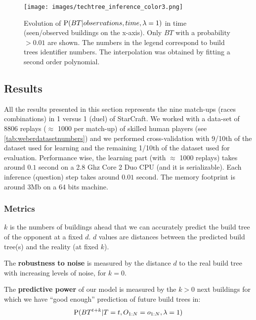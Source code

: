 \begin{figure}
\centerline{\texttt{[image: images/techtree\_inference\_color3.png]}}
\caption{Evolution of $\mathrm{P}(BT|observations,time,\lambda=1)$ in time (seen/observed buildings on the x-axis). Only $BT$ with a probability $> 0.01$ are shown. The numbers in the legend correspond to build trees identifier numbers. The interpolation was obtained by fitting a second order polynomial.}
\label{fig:ttinf}
\end{figure}


\subsection{Results}
All the results presented in this section represents the nine match-ups (races combinations) in 1 versus 1 (duel) of StarCraft. We worked with a data-set of 8806 replays ($\approx$ 1000 per match-up) of skilled human players (see \ref{tab:weberdatasetnumbers}) and we performed cross-validation with 9/10th of the dataset used for learning and the remaining 1/10th of the dataset used for evaluation. Performance wise, the learning part (with $\approx$ 1000 replays) takes around $0.1$ second on a 2.8 Ghz Core 2 Duo CPU (and it is serializable). Each inference (question) step takes around $0.01$ second. The memory footprint is around 3Mb on a 64 bits machine.

\subsubsection{Metrics}
\label{sec:buildtreemetrics}
$k$ is the numbers of buildings ahead that we can accurately predict the build tree of the opponent at a fixed $d$. $d$ values are distances between the predicted build tree(s) and the reality (at fixed $k$).

The \textbf{robustness to noise} is measured by the distance $d$ to the real build tree with increasing levels of noise, for $k=0$.

The \textbf{predictive power} of our model is measured by the $k>0$ next buildings for which we have ``good enough'' prediction of future build trees in:
$$\mathrm{P}(BT^{t+k} | T=t, O_{1:N}=o_{1:N}, \lambda = 1)$$

